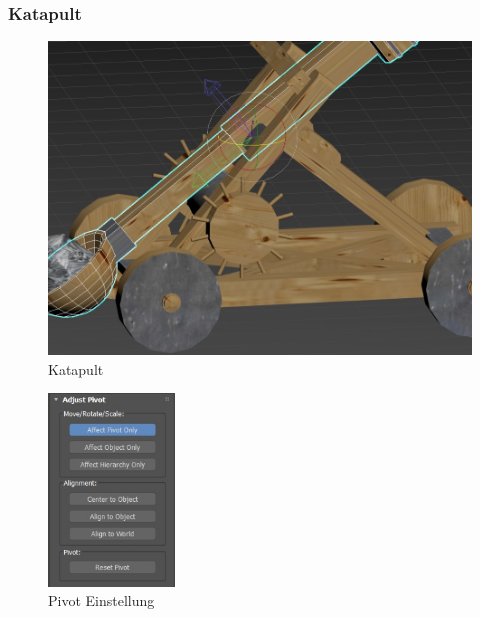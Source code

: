 \subsubsection{Katapult}

\begin{figure}[h]
	\centering
	\includegraphics[width=0.95 \linewidth]{Abbildungen/3dsMax/catapult}
	\caption{Katapult}
	\label{fig:catapult}
\end{figure}

\begin{figure}
	\begin{center}
		\includegraphics[width=0.3\textwidth]{Abbildungen/3dsMax/pivot}
	\end{center}
	\caption{Pivot Einstellung}
	\label{fig:Pivot}
\end{figure}

